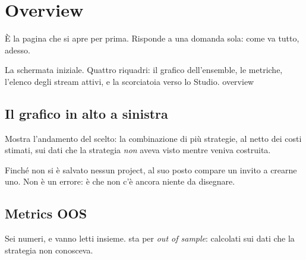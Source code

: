 \chapter{Overview}\label{cap:overview}

È la pagina che si apre per prima. Risponde a una domanda sola: come va
tutto, adesso.

  {La schermata iniziale. Quattro riquadri: il grafico dell'ensemble, le
   metriche, l'elenco degli stream attivi, e la scorciatoia verso lo Studio.}
  {overview}

\section{Il grafico in alto a sinistra}\label{sez:overview-grafico}

Mostra l'andamento del  scelto: la combinazione di più
strategie, al netto dei costi stimati, sui dati che la strategia
\emph{non} aveva visto mentre veniva costruita.

Finché non si è salvato nessun project, al suo posto compare un invito a
crearne uno. Non è un errore: è che non c'è ancora niente da disegnare.

\section{Metrics OOS}\label{sez:overview-metriche}

Sei numeri, e vanno letti insieme.  sta per \emph{out of sample}:
calcolati sui dati che la strategia non conosceva.

